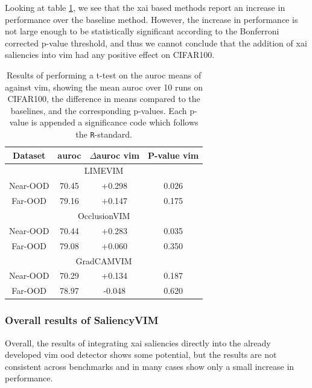 \documentclass[UKenglish]{uiomasterthesis} %
\theoremstyle{definition}
\begin{document}
Looking at table \ref{table:cifar100_salvim_ttest}, we see that the \ac{xai} based methods report an increase in performance over the baseline method. However, the increase in performance is not large enough to be statistically significant according to the Bonferroni corrected p-value threshold, and thus we cannot conclude that the addition of \ac{xai} saliencies into \ac{vim} had any positive effect on CIFAR100.

\begin{table}[H]
\setlength\tabcolsep{3pt}
\begin{center}
\begin{tabular}{ |c|c|c|c| }
    \hline
    Dataset & \ac{auroc} & $\Delta$\ac{auroc} \ac{vim} & P-value \ac{vim} \\
    \hline
    \hline
    \multicolumn{4}{|c|}{LIMEVIM} \\
    \hline
    \rowcolor{near!50}
    Near-OOD & 70.45 & +0.298 & 0.026 \\
    \rowcolor{far!50}
    Far-OOD & 79.16 & +0.147 & 0.175 \\
    \hline
    \hline
    \multicolumn{4}{|c|}{OcclusionVIM} \\
    \hline
    \rowcolor{near!50}
    Near-OOD & 70.44 & +0.283 & 0.035 \\
    \rowcolor{far!50}
    Far-OOD & 79.08 & +0.060 & 0.350 \\
    \hline
    \hline
    \multicolumn{4}{|c|}{GradCAMVIM} \\
    \hline
    \rowcolor{near!50}
    Near-OOD & 70.29 & +0.134 & 0.187 \\
    \rowcolor{far!50}
    Far-OOD & 78.97 & -0.048 & 0.620 \\
    \hline
    \end{tabular}
    \caption[]{Results of performing a t-test on the \ac{auroc} means of against \ac{vim}, showing the mean \ac{auroc} over 10 runs on CIFAR100, the difference in means compared to the baselines, and the corresponding p-values. Each p-value is appended a significance code which follows the \texttt{R}-standard.}
    \label{table:cifar100_salvim_ttest}
\end{center}
\setlength\tabcolsep{6pt}
\end{table}

\subsubsection{Overall results of SaliencyVIM}

Overall, the results of integrating \ac{xai} saliencies directly into the already developed \ac{vim} \ac{ood} detector shows some potential, but the results are not consistent across benchmarks and in many cases show only a small increase in performance.
\end{document}
